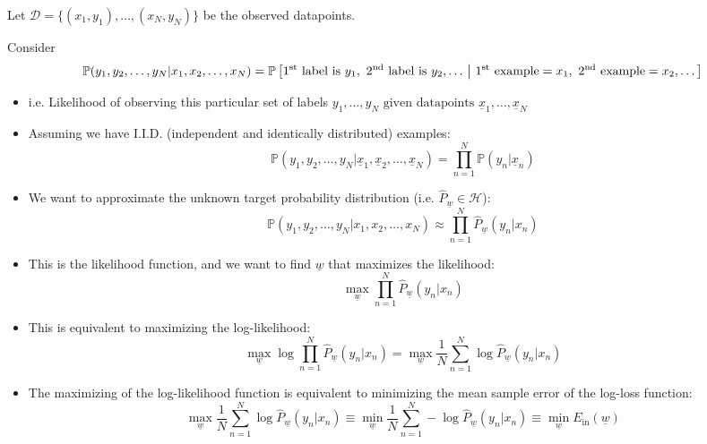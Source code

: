     \begin{derivation}
        Let \(\mathcal{D} = \{(x_1, y_1), \dots, (x_N, y_N)\}\) be the observed datapoints.
        \vspace{1em}

        Consider
        \[
        \mathbb{P}(y_1, y_2, \dots, y_N | x_1, x_2, \dots, x_N) = \mathbb{P}\left[ \text{1\textsuperscript{st} label is } y_1, \text{ 2\textsuperscript{nd} label is } y_2, \dots \ \middle| \ \text{1\textsuperscript{st} example} = x_1, \text{ 2\textsuperscript{nd} example} = x_2, \dots \right]
        \]
        \begin{itemize}
            \item i.e. Likelihood of observing this particular set of labels  $y_1, \dots, y_N \text{ given datapoints } \underline{x}_1, \dots, \underline{x}_N$
            \item Assuming we have I.I.D. (independent and identically distributed) examples:
            \[
            \mathbb{P}(y_1, y_2, \dots, y_N | \underline{x}_1, \underline{x}_2, \dots, \underline{x}_N) = \prod_{n=1}^{N} \mathbb{P}(y_n | \underline{x}_n)
            \]
            \item We want to approximate the unknown target probability distribution (i.e. $\hat{P}_{\underline{w}} \in \mathcal{H}$):
            \[
            \mathbb{P}(y_1, y_2, \dots, y_N | x_1, x_2, \dots, x_N) \approx \prod_{n=1}^{N} \hat{P}_{\underline{w}}(y_n | x_n)
            \]
            \item This is the likelihood function, and we want to find \( \underline{w} \) that maximizes the likelihood:
            \[
            \max_{\underline{w}} \prod_{n=1}^{N} \hat{P}_{\underline{w}}(y_n | x_n)
            \]
            \item This is equivalent to maximizing the log-likelihood:
            \[
            \max_{\underline{w}} \log \prod_{n=1}^{N} \hat{P}_{\underline{w}}(y_n | x_n) = \max_{\underline{w}} \frac{1}{N} \sum_{n=1}^{N} \log \hat{P}_{\underline{w}}(y_n | x_n)
            \]
            \item The maximizing of the log-likelihood function is equivalent to minimizing the mean sample error of the log-loss function:
            \[
            \max_{\underline{w}} \frac{1}{N} \sum_{n=1}^{N} \log \hat{P}_{\underline{w}}(y_n | x_n) \equiv \min_{\underline{w}} \frac{1}{N} \sum_{n=1}^{N} - \log \hat{P}_{\underline{w}}(y_n | x_n) \equiv \min_{\underline{w}} E_{\text{in}}(\underline{w})
            \]
        \end{itemize}
    \end{derivation}

